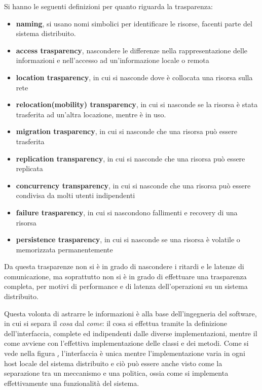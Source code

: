 \documentclass[a4paper,12pt, oneside]{book}
\begin{document}
Si hanno le seguenti definizioni per quanto riguarda la trasparenza:
\begin{itemize}
    \item \textbf{naming}, si usano nomi simbolici per identificare le risorse,
            facenti parte del sistema distribuito.
    \item \textbf{access trasparency}, nascondere le differenze nella rappresentazione 
        delle informazioni e nell'accesso ad un'informazione locale o remota 
    \item \textbf{location trasparency}, in cui si nasconde dove è collocata una risorsa sulla rete
    \item  \textbf{relocation(mobility) transparency}, in cui si nasconde se la risorsa è stata
        trasferita ad un'altra locazione, mentre è in uso.
    \item \textbf{migration trasparency}, in cui si nasconde che una risorsa può essere trasferita
    \item \textbf{replication transparency}, in cui si nasconde che una risorsa può essere replicata
    \item \textbf{concurrency transparency}, in cui si nasconde che una risorsa può essere condivisa
        da molti utenti indipendenti
    \item \textbf{failure trasparency}, in cui si nascondono fallimenti e recovery di una risorsa
    \item \textbf{persistence trasparency}, in cui si nasconde se una risorsa
                  è volatile o memorizzata permanentemente
\end{itemize}
Da questa trasparenze non si è in grado di nascondere i ritardi e le latenze di comunicazione, ma
soprattutto non si è in grado di effettuare una trasparenza completa, per motivi di performance
e di latenza dell'operazioni su un sistema distribuito.

Questa volonta di astrarre le informazioni è alla base dell'ingegneria del software, in cui si separa
il \textit{cosa} dal \textit{come}: il cosa si effettua tramite la definizione dell'interfaccia, complete
ed indipendenti dalle diverse implementazioni, mentre il come avviene con l'effettiva implementazione
delle classi e dei metodi.\newline
Come si vede nella figura \href{figura:interfaccia}, l'interfaccia è unica mentre l'implementazione
varia in ogni host locale del sistema distribuito e ciò può essere anche visto come la separazione
tra un meccanismo e una politica, ossia come si implementa effettivamente una funzionalità del sistema.
\end{document}

